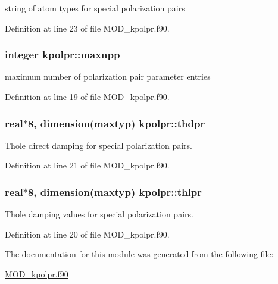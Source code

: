 string of atom types for special polarization pairs 



Definition at line 23 of file M\-O\-D\-\_\-kpolpr.\-f90.

\hypertarget{classkpolpr_adbc49463af8a226063a26ea44a9051d0}{
\subsubsection[{maxnpp}]{\setlength{\rightskip}{0pt plus 5cm}integer kpolpr\-::maxnpp}}\label{classkpolpr_adbc49463af8a226063a26ea44a9051d0}


maximum number of polarization pair parameter entries 



Definition at line 19 of file M\-O\-D\-\_\-kpolpr.\-f90.

\hypertarget{classkpolpr_ade1cdc47155175ca210ef8f8c618c2de}{
\subsubsection[{thdpr}]{\setlength{\rightskip}{0pt plus 5cm}real$\ast$8, dimension(maxtyp) kpolpr\-::thdpr}}\label{classkpolpr_ade1cdc47155175ca210ef8f8c618c2de}


Thole direct damping for special polarization pairs. 



Definition at line 21 of file M\-O\-D\-\_\-kpolpr.\-f90.

\hypertarget{classkpolpr_a582375b52442e078d9ce8796a765bc5c}{
\subsubsection[{thlpr}]{\setlength{\rightskip}{0pt plus 5cm}real$\ast$8, dimension(maxtyp) kpolpr\-::thlpr}}\label{classkpolpr_a582375b52442e078d9ce8796a765bc5c}


Thole damping values for special polarization pairs. 



Definition at line 20 of file M\-O\-D\-\_\-kpolpr.\-f90.



The documentation for this module was generated from the following file\-:\begin{DoxyCompactItemize}
\item 
\hyperlink{MOD__kpolpr_8f90}{M\-O\-D\-\_\-kpolpr.\-f90}\end{DoxyCompactItemize}
